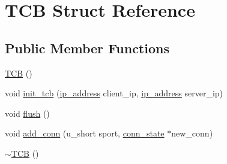 \hypertarget{structTCB}{\section{\-T\-C\-B \-Struct \-Reference}
\label{structTCB}
}
\subsection*{\-Public \-Member \-Functions}
\begin{DoxyCompactItemize}
\item 
\hyperlink{structTCB_aa619e6a500feb87675186b0f105dd6c7}{\-T\-C\-B} ()
\item 
void \hyperlink{structTCB_af9fa7da15c22ab9577330678bec7cebe}{init\-\_\-tcb} (\hyperlink{structip__address}{ip\-\_\-address} client\-\_\-ip, \hyperlink{structip__address}{ip\-\_\-address} server\-\_\-ip)
\item 
void \hyperlink{structTCB_a8928fb28abe130ed05d9600f1c3351fd}{flush} ()
\item 
void \hyperlink{structTCB_af7d4be8156a7b15e734e7a526160300f}{add\-\_\-conn} (u\-\_\-short sport, \hyperlink{structconn__state}{conn\-\_\-state} $\ast$new\-\_\-conn)
\item 
\hyperlink{structTCB_a1035bc2b4149c8b7b35dce89636b70ad}{$\sim$\-T\-C\-B} ()
\end{DoxyCompactItemize}
